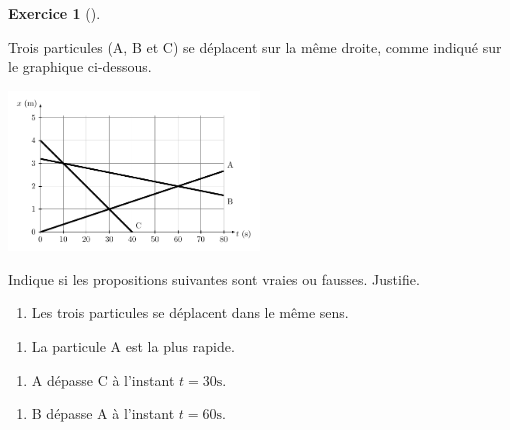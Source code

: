 \documentclass[
  letterpaper,
  DIV=11,
  numbers=noendperiod]{scrartcl}
\providecommand{\tightlist}{%
  \setlength{\itemsep}{0pt}\setlength{\parskip}{0pt}}\usepackage{longtable,booktabs,array}
\theoremstyle{definition}
\newtheorem{exercise}{Exercice}[section]
\theoremstyle{definition}
\theoremstyle{remark}
\begin{document}
\begin{exercise}[]\protect\hypertarget{exr-croisement}{}\label{exr-croisement}

Trois particules (A, B et C) se déplacent sur la même droite, comme
indiqué sur le graphique ci-dessous.

\begin{center}
\includegraphics[width=0.5\textwidth,height=\textheight]{figures/mru/fig11.pdf}
\end{center}

Indique si les propositions suivantes sont vraies ou fausses. Justifie.

\begin{enumerate}
\def\labelenumi{\arabic{enumi}.}
\tightlist
\item
  Les trois particules se déplacent dans le même sens.
\end{enumerate}

\vspace{2cm}

\begin{enumerate}
\def\labelenumi{\arabic{enumi}.}
\setcounter{enumi}{1}
\tightlist
\item
  La particule A est la plus rapide.
\end{enumerate}

\vspace{2cm}

\begin{enumerate}
\def\labelenumi{\arabic{enumi}.}
\setcounter{enumi}{2}
\tightlist
\item
  A dépasse C à l'instant \(t=30\text{s}\).
\end{enumerate}

\vspace{2cm}

\begin{enumerate}
\def\labelenumi{\arabic{enumi}.}
\setcounter{enumi}{3}
\tightlist
\item
  B dépasse A à l'instant \(t=60\text{s}\).
\end{enumerate}

\vspace{2cm}


\end{exercise}
\end{document}

